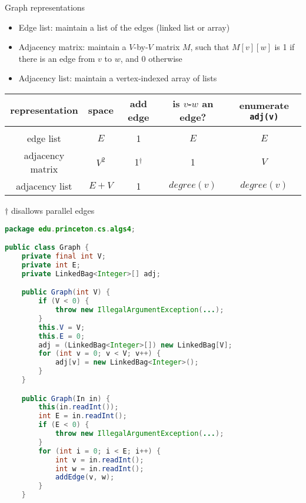 \documentclass[8pt,a4paper,compress]{beamer}
\begin{document}
\begin{frame}[fragile]
Graph representations
\begin{itemize}
\item Edge list: maintain a list of the edges (linked list or array)

\item Adjacency matrix: maintain a $V$-by-$V$ matrix $M$, such that $M[v][w]$ is 1 if there is an edge from $v$ to $w$, and 0 otherwise

\item Adjacency list: maintain a vertex-indexed array of lists
\end{itemize}

\begin{center}
\begin{tabular}{ccccc}
representation & space & add edge & is $v$-$w$ an edge? & enumerate \lstinline$adj(v)$ \\ \hline \\
edge list & $E$ & 1 & $E$ & $E$ \\
adjacency matrix & $V^2$ & 1$^\dagger$ & 1 & $V$ \\ 
adjacency list & $E+V$ & 1 & $degree(v)$ & $degree(v)$ 
\end{tabular}  

\smallskip

\small $\dagger$ disallows parallel edges
\end{center}
\end{frame}

\begin{frame}[fragile]
\begin{lstlisting}[language=Java]
package edu.princeton.cs.algs4;

public class Graph {
    private final int V;
    private int E;
    private LinkedBag<Integer>[] adj;

    public Graph(int V) {
        if (V < 0) {
            throw new IllegalArgumentException(...); 
        }
        this.V = V;
        this.E = 0;
        adj = (LinkedBag<Integer>[]) new LinkedBag[V];
        for (int v = 0; v < V; v++) {
            adj[v] = new LinkedBag<Integer>();
        }
    }

    public Graph(In in) {
        this(in.readInt());
        int E = in.readInt();
        if (E < 0) { 
            throw new IllegalArgumentException(...);
        }
        for (int i = 0; i < E; i++) {
            int v = in.readInt();
            int w = in.readInt();
            addEdge(v, w);
        }
    }
\end{lstlisting}
\end{frame}
\end{document}
